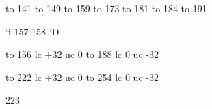 

\startmapping[ec]

 to 141
 to 149
 to 159
 to 173
 to 181
 to 184
 to 191

 `i 157
 158 `D

 to 156 lc +32 uc   0
 to 188 lc   0 uc -32

 to 222 lc +32 uc   0
 to 254 lc   0 uc -32

 223






